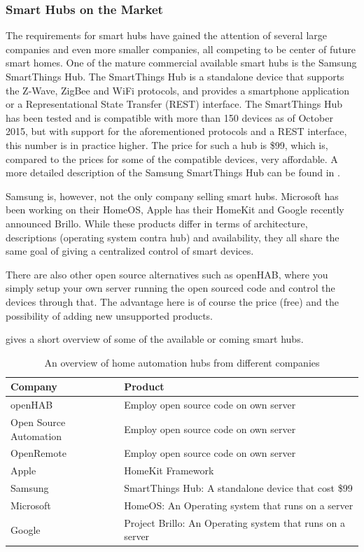 \subsubsection{Smart Hubs on the Market}
The requirements for smart hubs have gained the attention of several large companies and even more smaller companies, 
all competing to be center of future smart homes. 
One of the mature commercial available smart hubs is the Samsung SmartThings Hub\cite{SMARTTHINGS}. 
The SmartThings Hub is a standalone device that supports the Z-Wave, ZigBee and WiFi protocols, 
and provides a smartphone application or a Representational State Transfer (REST) interface. 
The SmartThings Hub has been tested and is compatible with more than 150 devices as of October 2015,
but with support for the aforementioned protocols and a REST interface, this number is in practice higher.  
The price for such a hub is \$99, which is, compared to the prices for some of the compatible devices, very affordable. 
A more detailed description of the Samsung SmartThings Hub can be found in . 

Samsung is, however, not the only company selling smart hubs. 
Microsoft has been working on their HomeOS\cite{HOMEOS}, Apple has their HomeKit\cite{HOMEKIT} and Google recently announced Brillo\cite{BRILLO}. 
While these products differ in terms of architecture, descriptions (operating system contra hub) and availability,
they all share the same goal of giving a centralized control of smart devices. 

There are also other open source alternatives such as openHAB\cite{OPENHAB}, 
where you simply setup your own server running the open sourced code and control the devices through that. 
The advantage here is of course the price (free) and the possibility of adding new unsupported products. 

 gives a short overview of some of the available or coming smart hubs. 
\begin{table}
    \centering
    \begin{tabular}{l l}
        Company                           & Product                              \\\hline
        openHAB\cite{OPENHAB}             & Employ open source code on own server \\
        Open Source Automation\cite{OSA}  & Employ open source code on own server \\
        OpenRemote\cite{OPENREMOTE}       & Employ open source code on own server \\
        Apple\cite{HOMEKIT}               & HomeKit Framework \\
        Samsung\cite{SMARTTHINGS}         & SmartThings Hub: A standalone device that cost \$99 \\
        Microsoft\cite{HOMEOS}            & HomeOS: An Operating system that runs on a server \\
        Google\cite{BRILLO}               & Project Brillo: An Operating system that runs on a server
    \end{tabular}
    \caption{An overview of home automation hubs from different companies}
    \label{table:smarthubs}
\end{table}

